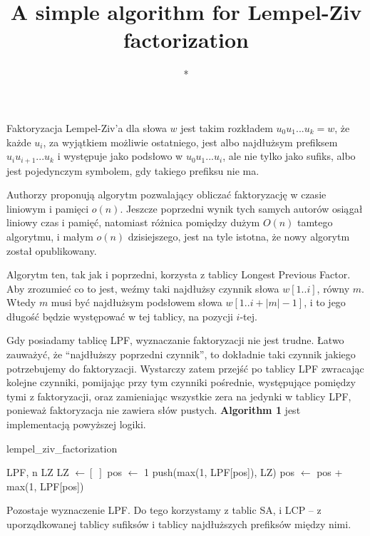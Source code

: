 \documentclass[a4paper,12pt]{article}
\title{A simple algorithm for Lempel-Ziv factorization}
\author{*}
\begin{document}
\maketitle

Faktoryzacja Lempel-Ziv'a dla słowa $w$ jest takim rozkładem $u_0 u_1 ... u_k = w$,
że każde $u_i$, za wyjątkiem możliwie ostatniego,
jest albo najdłużsym prefiksem $u_i u_{i + 1} ... u_k$ i występuje jako podsłowo w $u_0 u_1 ... u_i$,
ale nie tylko jako sufiks,
albo jest pojedynczym symbolem, gdy takiego prefiksu nie ma.

Authorzy proponują algorytm pozwalający obliczać faktoryzację w czasie liniowym i pamięci $o(n)$.
Jeszcze poprzedni wynik tych samych autorów osiągał liniowy czas i pamięć,
natomiast różnica pomiędzy dużym $O(n)$ tamtego algorytmu, i małym $o(n)$ dzisiejszego, jest na tyle istotna,
że nowy algorytm został opublikowany.

Algorytm ten, tak jak i poprzedni, korzysta z tablicy Longest Previous Factor.
Aby zrozumieć co to jest, weźmy taki najdłużsy czynnik słowa $w[1..i]$, równy $m$.
Wtedy $m$ musi być najdłużsym podsłowem słowa $w[1..i + |m| - 1]$,
i to jego długość będzie występować w tej tablicy, na pozycji $i$-tej.

Gdy posiadamy tablicę LPF, wyznaczanie faktoryzacji nie jest trudne.
Łatwo zauważyć, że ``najdłuższy poprzedni czynnik'', to dokładnie taki czynnik jakiego potrzebujemy do faktoryzacji.
Wystarczy zatem przejść po tablicy LPF zwracając kolejne czynniki,
pomijając przy tym czynniki pośrednie, występujące pomiędzy tymi z faktoryzacji,
oraz zamieniając wszystkie zera na jedynki w tablicy LPF, ponieważ faktoryzacja nie zawiera słów pustych.
\textbf{Algorithm 1} jest implementacją powyższej logiki.

\begin{algorithm}
\caption{lempel\_ziv\_factorization}
\begin{algorithmic} 
\REQUIRE LPF, n
\ENSURE LZ
\STATE LZ $\gets [\;]$
\STATE pos $\gets$ 1
\STATE push(max(1, LPF[pos]), LZ)
\STATE pos $\gets$ pos + max(1, LPF[pos])
\ENDWHILE
\end{algorithmic}
\end{algorithm}

Pozostaje wyznaczenie LPF. Do tego korzystamy z tablic SA, i LCP --
z uporządkowanej tablicy sufiksów i tablicy najdłuższych prefiksów między nimi.

\pagebreak
\end{document}
